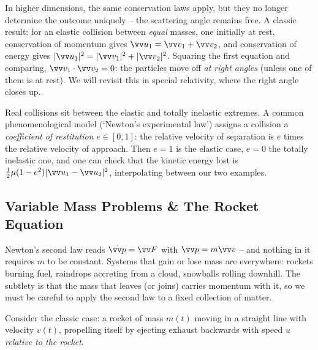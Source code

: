 In higher dimensions, the same conservation laws apply, but they no longer determine the outcome uniquely -- the scattering angle remains free. A classic result: for an elastic collision between \emph{equal} masses, one initially at rest, conservation of momentum gives $\vv u_1 = \vv v_1 + \vv v_2$, and conservation of energy gives $|\vv u_1|^2 = |\vv v_1|^2 + |\vv v_2|^2$. Squaring the first equation and comparing, $\vv v_1 \cdot \vv v_2 = 0$: the particles move off \emph{at right angles} (unless one of them is at rest). We will revisit this in special relativity, where the right angle closes up.

\begin{remark}
	Real collisions sit between the elastic and totally inelastic extremes. A common phenomenological model (`Newton's experimental law') assigns a collision a \emph{coefficient of restitution} $e \in [0, 1]$: the relative velocity of separation is $e$ times the relative velocity of approach. Then $e = 1$ is the elastic case, $e = 0$ the totally inelastic one, and one can check that the kinetic energy lost is $\frac{1}{2}\mu (1 - e^2) |\vv u_1 - \vv u_2|^2$, interpolating between our two examples.
\end{remark}

\subsection{Variable Mass Problems \& The Rocket Equation}

Newton's second law reads $\dot{\vv p} = \vv F$ with $\vv p = m \vv v$ -- and nothing in it requires $m$ to be constant. Systems that gain or lose mass are everywhere: rockets burning fuel, raindrops accreting from a cloud, snowballs rolling downhill. The subtlety is that the mass that leaves (or joins) carries momentum with it, so we must be careful to apply the second law to a fixed collection of matter.

Consider the classic case: a rocket of mass $m(t)$ moving in a straight line with velocity $v(t)$, propelling itself by ejecting exhaust backwards with speed $u$ \emph{relative to the rocket}.

\begin{center}
\end{center}

